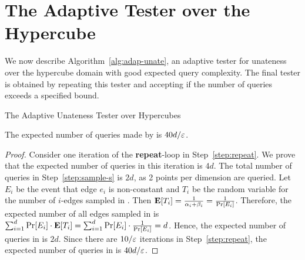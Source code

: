\section{The Adaptive Tester over the Hypercube}\label{sec:adap-ub}
We now describe Algorithm~\ref{alg:adap-unate}, an adaptive tester for unateness over the hypercube domain with good expected query complexity. The final tester is obtained by repeating this tester and accepting if the number of queries exceeds a specified bound.

\begin{algorithm}
\caption{The Adaptive Unateness Tester over Hypercubes} \label{alg:adap-unate}
\DontPrintSemicolon
\BlankLine
\nl\label{step:repeat}
\end{algorithm}

\begin{claim} \label{clm:time}
The expected number of queries made by
 is $40d/\varepsilon$.
\end{claim}

\begin{proof}
Consider one iteration of the {\bf repeat}-loop in Step~\ref{step:repeat}.
We prove that the expected number of queries in this iteration is $4d$.
The total number of queries in Step~\ref{step:sample-s} is $2d$, as 2 points per dimension are queried.
	Let $E_i$ be the event that edge $e_i$ is non-constant and $T_i$ be the random variable for the number of $i$-edges sampled in . Then $\hbox{\bf E}[T_i] = \frac 1{\alpha_i+\beta_i}=\frac 1{\Pr[E_i]}$. Therefore, the expected number of all edges sampled in  is $\sum_{i=1}^d \Pr[E_i]\cdot\hbox{\bf E}[T_i]=\sum_{i=1}^d \Pr[E_i] \cdot \frac 1{\Pr[E_i]} = d$. Hence, the expected number of queries in  is $2d$. Since there are $10/\varepsilon$ iterations in Step~\ref{step:repeat}, the expected number of queries in  is $40d/\varepsilon$.
\end{proof}


